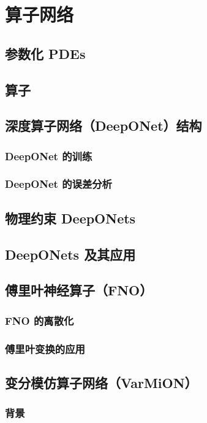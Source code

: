 \chapter{算子网络}

\section{参数化 PDEs}

\section{算子}

\section{深度算子网络（DeepONet）结构}
\subsection{DeepONet 的训练}
\subsection{DeepONet 的误差分析}

\section{物理约束 DeepONets}

\section{DeepONets 及其应用}

\section{傅里叶神经算子（FNO）}
\subsection{FNO 的离散化}
\subsection{傅里叶变换的应用}

\section{变分模仿算子网络（VarMiON）}
\subsection{背景}
